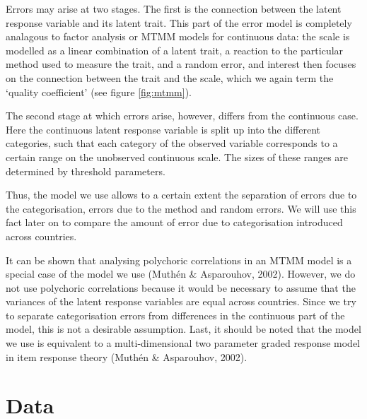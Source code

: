 \documentclass[a4paper,12pt]{article}
\begin{document}
Errors may arise at two stages. The first is the connection between the latent response variable and its latent trait. This part of the error model is completely analagous to factor analysis or MTMM models for continuous data: the scale is modelled as a linear combination of a latent trait, a reaction to the particular method used to measure the trait, and a random error, and interest then focuses on the connection between the trait and the scale, which we again term the `quality coefficient' (see figure \ref{fig:mtmm}). 

The second stage at which errors arise, however, differs from the continuous case. Here the continuous latent response variable is split up into the different categories, such that each category of the observed variable corresponds to a certain range on the unobserved continuous scale. The sizes of these ranges are determined by threshold parameters.

Thus, the model we use allows to a certain extent the separation of errors due to the categorisation, errors due to the method and random errors. We will use this fact later on to compare the amount of error due to categorisation introduced across countries.

It can be shown that analysing polychoric correlations in an MTMM model is a special case of the model we use (Muth\'{e}n \& Asparouhov, 2002). However, we do not use polychoric correlations because it would be  necessary to assume that the variances of the latent response variables are equal across countries. Since we try to separate categorisation errors from differences in the continuous part of the model, this is not a desirable assumption. Last, it should be noted that the model we use is equivalent to a multi-dimensional two parameter graded response model in item response theory (Muth\'{e}n \& Asparouhov, 2002).


\section{Data}
\end{document}
